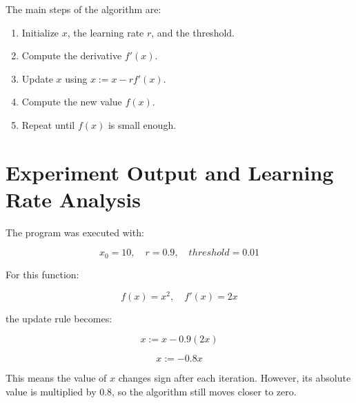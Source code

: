 \documentclass[12pt,a4paper]{article}
\begin{document}
The main steps of the algorithm are:

\begin{enumerate}
  \item Initialize \(x\), the learning rate \(r\), and the threshold.
  \item Compute the derivative \(f'(x)\).
  \item Update \(x\) using \(x := x - r f'(x)\).
  \item Compute the new value \(f(x)\).
  \item Repeat until \(f(x)\) is small enough.
\end{enumerate}

\section{Experiment Output and Learning Rate Analysis}

The program was executed with:

\[
x_0 = 10, \quad r = 0.9, \quad threshold = 0.01
\]

For this function:

\[
f(x)=x^2, \quad f'(x)=2x
\]

the update rule becomes:

\[
x := x - 0.9(2x)
\]

\[
x := -0.8x
\]

This means the value of \(x\) changes sign after each iteration.
However, its absolute value is multiplied by \(0.8\), so the algorithm still moves closer to zero.
\end{document}

